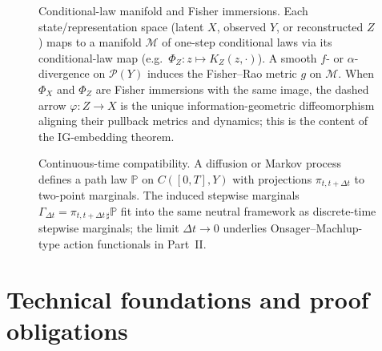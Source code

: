 \documentclass[11pt]{article}
\newcommand{\1}{\mathbf{1}}
\begin{document}
\begin{figure}[H]
  \centering
  \caption{%
  Conditional-law manifold and Fisher immersions. Each state/representation space (latent $X$, observed $Y$, or reconstructed $Z$) maps to a manifold $\mathcal{M}$ of one-step conditional laws via its conditional-law map (e.g.\ $\Phi_Z:z \mapsto K_Z(z,\cdot)$). A smooth $f$- or $\alpha$-divergence on $\mathcal{P}(Y)$ induces the Fisher--Rao metric $g$ on $\mathcal{M}$. When $\Phi_X$ and $\Phi_Z$ are Fisher immersions with the same image, the dashed arrow $\varphi:Z\to X$ is the unique information-geometric diffeomorphism aligning their pullback metrics and dynamics; this is the content of the IG-embedding theorem.%
  }
  \label{fig:fisher-immersion}
\end{figure}

\begin{figure}[H]
  \centering
  \caption{%
  Continuous-time compatibility. A diffusion or Markov process defines a path law $\mathbb{P}$ on $C([0,T],Y)$ with projections $\pi_{t,t+\Delta t}$ to two-point marginals. The induced stepwise marginals $\Gamma_{\Delta t} = \pi_{t,t+\Delta t\,\sharp}\mathbb{P}$ fit into the same neutral framework as discrete-time stepwise marginals; the limit $\Delta t \to 0$ underlies Onsager--Machlup-type action functionals in Part~II.%
  }
  \label{fig:path-to-stepwise}
\end{figure}


\newpage


\section{Technical foundations and proof obligations}
\label{app:ig-embedding}
\label{sec:proofs}
\end{document}
